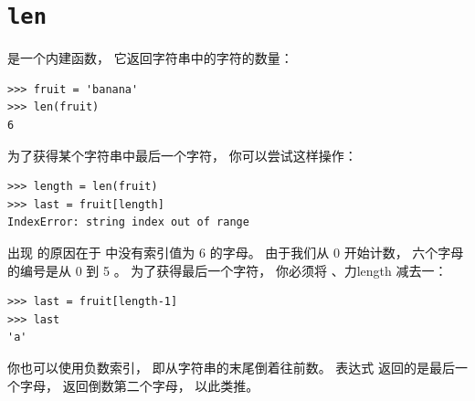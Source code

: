 \section{{\tt len}}
  
  


 是一个内建函数， 它返回字符串中的字符的数量：

\begin{lstlisting}
>>> fruit = 'banana'
>>> len(fruit)
6
\end{lstlisting}

%
  

为了获得某个字符串中最后一个字符， 你可以尝试这样操作：

\begin{lstlisting}
>>> length = len(fruit)
>>> last = fruit[length]
IndexError: string index out of range
\end{lstlisting}

%

出现  的原因在于  中没有索引值为 6 的字母。  由于我们从 0 开始计数， 六个字母的编号是从 0 到 5 。  为了获得最后一个字符， 你必须将 、力{length} 减去一：

\begin{lstlisting}
>>> last = fruit[length-1]
>>> last
'a'
\end{lstlisting}

%
  

你也可以使用负数索引， 即从字符串的末尾倒着往前数。  表达式  返回的是最后一个字母，  返回倒数第二个字母， 以此类推。
  


